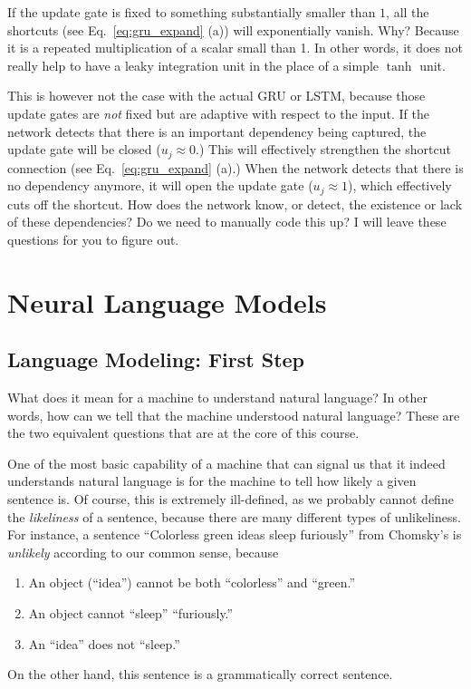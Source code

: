 \documentclass{report}
\newcommand{\alert}[1]{\textcolor{red}{#1}}
\begin{document}
If the update gate is fixed to something substantially smaller than $1$, all the
shortcuts (see Eq.~\eqref{eq:gru_expand} (a)) will exponentially vanish. Why?
Because it is a repeated multiplication of a scalar small than 1. In other
words, it does not really help to have a leaky integration unit in the place of
a simple $\tanh$ unit.

This is however not the case with the actual GRU or LSTM, because those update
gates are {\em not} fixed but are adaptive with respect to the input. If the
network detects that there is an important dependency being captured, the update
gate will be closed ($u_j \approx 0$.) This will effectively strengthen the
shortcut connection (see Eq.~\eqref{eq:gru_expand} (a).) When the network
detects that there is no dependency anymore, it will open the update gate ($u_j
\approx 1$), which effectively cuts off the shortcut. How does the network know,
or detect, the existence or lack of these dependencies? Do we need to manually
code this up? I will leave these questions for you to figure out.


%


\chapter{Neural Language Models}
\label{chap:nlm}

\section{Language Modeling: First Step}

What does it mean for a machine to understand natural language? In other words,
how can we tell that the machine understood natural language?  These are the two
equivalent questions that are at the core of this course. 

One of the most basic capability of a machine that can signal us that it indeed
understands natural language is for the machine to tell how likely a given
sentence is. Of course, this is extremely ill-defined, as we probably cannot
define the {\em likeliness} of a sentence, because there are many different
types of unlikeliness. For instance, a sentence ``Colorless green ideas sleep
furiously'' from Chomsky's \cite{chomsky2002syntactic} is {\em unlikely}
according to our common sense, because 
\begin{enumerate}
    \itemsep 0em
    \item An object (``idea'') cannot be both ``colorless'' and ``green.''
    \item An object cannot ``sleep'' ``furiously.''
    \item An ``idea'' does not ``sleep.''
\end{enumerate}
On the other hand, this sentence is a grammatically correct sentence.
\end{document}
